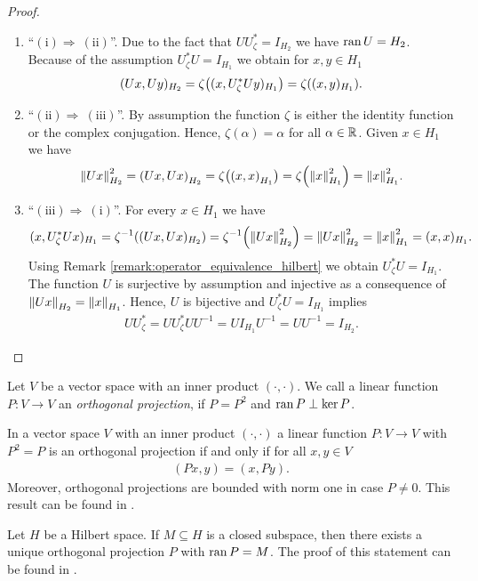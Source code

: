 \begin{proof}
	\begin{enumerate}
		\phantom{}
		\item[]\enquote{$(\mathrm{i}) \Rightarrow \ (\mathrm{ii})$}. Due to the fact that $U U_\zeta^\ast = I_{H_2}$ we have $\ran U = H_2$. Because of the assumption $U_\zeta^\ast U = I_{H_1}$ we obtain for $x,y \in H_1$ 
		\begin{align*}
			(Ux, Uy)_{H_2} = \zeta\pbraces{(x, U_\zeta^\ast U y)_{H_1}} = \zeta \pbraces{(x,y)_{H_1}}.
		\end{align*}
		
		\item[]\enquote{$(\mathrm{ii}) \Rightarrow \ (\mathrm{iii})$}. By assumption the function $\zeta$ is either the identity function or the complex conjugation. Hence, $\zeta(\alpha) = \alpha$ for all $\alpha \in \R$. Given $x \in H_1$ we have
		\begin{align*}
			\norm[H_2]{Ux}^2 = \pbraces{Ux, Ux}_{H_2} = \zeta\pbraces{\pbraces{x, x}_{H_1}} = \zeta\pbraces{\norm[H_1]{x}^2} = \norm[H_1]{x}^2.
		\end{align*} 
		
		\item[]\enquote{$(\mathrm{iii}) \Rightarrow \ (\mathrm{i})$}. For every $x \in H_1$ we have 
		\begin{align*}
			(x, U_\zeta^\ast U x)_{H_1} = \zeta^{-1}\pbraces{(Ux, Ux)_{H_2}} = \zeta^{-1} \pbraces{\norm[H_2]{Ux}^2} = \norm[H_2]{Ux}^2 = \norm[H_1]{x}^2 = (x,x)_{H_1}.
		\end{align*}
		Using Remark \ref{remark:operator_equivalence_hilbert} we obtain $U_\zeta^\ast U = I_{H_1}$. The function $U$ is surjective by assumption and injective as a consequence of $\norm[H_2]{Ux} = \norm[H_1]{x}$. Hence, $U$ is bijective and $U_\zeta^\ast U = I_{H_1}$ implies
		\begin{align*}
			U U_\zeta^\ast = U U_\zeta^\ast UU^{-1} = UI_{H_1}U^{-1} = UU^{-1} = I_{H_2}.
		\end{align*}
	\end{enumerate}
\end{proof}


\begin{definition}
	Let $V$ be a vector space with an inner product $(\cdot, \cdot)$. We call a linear function $P: V \to V$ an \textit{orthogonal projection}, if $P = P^2$ and $\ran P \perp \ker P$.
\end{definition}


\begin{remark}
	In a vector space $V$ with an inner product $(\cdot, \cdot)$ a linear function $P: V \to V$ with $P^2 = P$ is an orthogonal projection if and only if for all $x,y \in V$
	\begin{align*}
		(Px, y) = (x,Py).
	\end{align*}
	Moreover, orthogonal projections are bounded with norm one in case $P \neq 0$. This result can be found in \cite[p. 47]{FAna1}.
\end{remark}


\begin{remark} \label{remark:orth_proj_uniqueness}
	Let $H$ be a Hilbert space. If $M \subseteq H$ is a closed subspace, then there exists a unique orthogonal projection $P$ with $\ran P = M$. The proof of this statement can be found in \cite[p. 48]{FAna1}.
\end{remark}